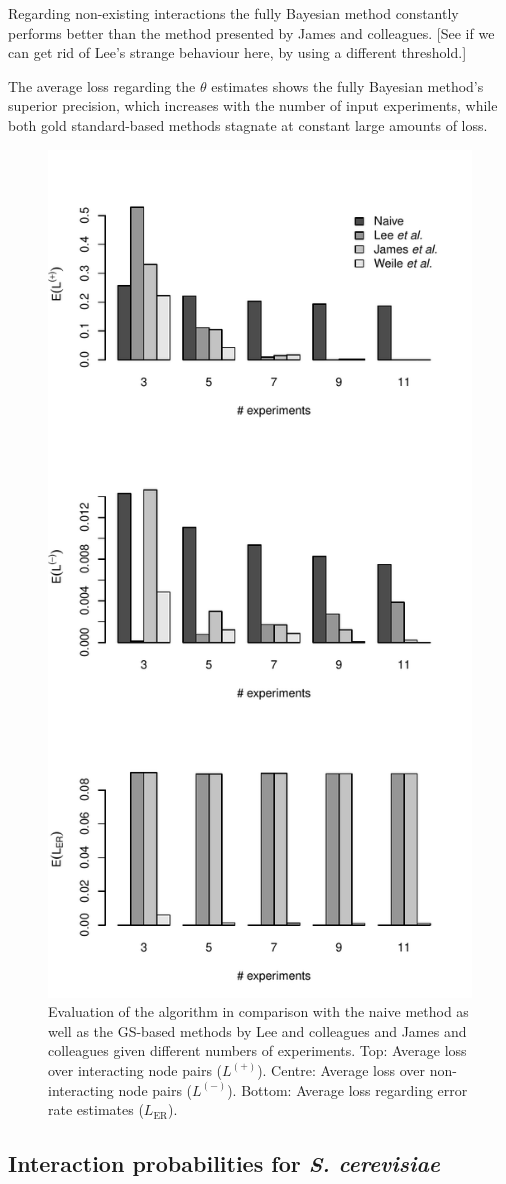 \documentclass{bioinfo}
\newcommand{\species}[1]{\textit{#1}}
\newcommand{\note}[1]{{\color{red}[#1]}}
\begin{document}
Regarding non-existing interactions the fully Bayesian method constantly performs better than the method presented by James and colleagues. \note{See if we can get rid of Lee's strange behaviour here, by using a different threshold.}

The average loss regarding the $\theta$ estimates shows the fully Bayesian method's superior precision, which increases with the number of input experiments, while both gold standard-based methods stagnate at constant large amounts of loss.

\begin{figure}[!tpb]
\centerline{\includegraphics[width=.5\textwidth]{fig1.pdf}}
\caption{Evaluation of the algorithm in comparison with the naive method as well as the GS-based methods by Lee and colleagues and James and colleagues given different numbers of experiments. Top: Average loss over interacting node pairs ($L^{(+)}$). Centre: Average loss over non-interacting node pairs ($L^{(-)}$). Bottom: Average loss regarding error rate estimates ($L_\text{ER}$).}
\label{htp}
\end{figure}


\subsection{Interaction probabilities for \species{S. cerevisiae}}
\end{document}
